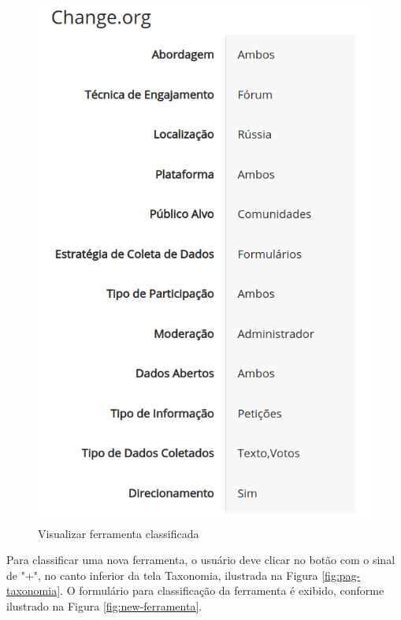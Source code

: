 \begin{figure}[!ht]
    \centering
    \includegraphics[scale=0.20]{./figuras/show-ferramenta.png}
    \caption{Visualizar ferramenta classificada}
    \label{fig:show-ferramenta}
\end{figure}


\par
Para classificar uma nova ferramenta, o usuário deve clicar no botão com o  sinal de "+", no canto inferior da tela Taxonomia, ilustrada na Figura \ref{fig:pag-taxonomia}. 
O formulário para classificação da ferramenta é exibido, conforme ilustrado na Figura \ref{fig:new-ferramenta}. 


